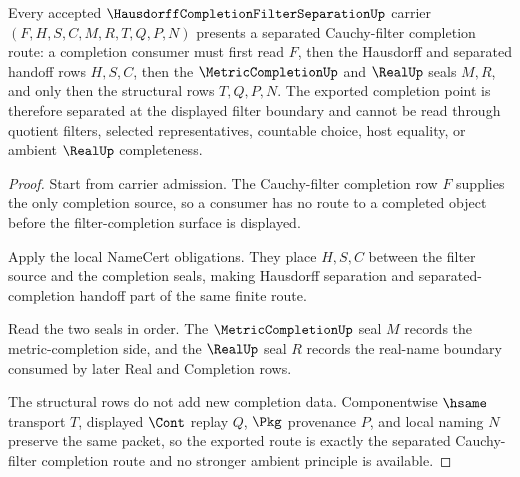 \begin{theorem}
\label{thm:hausdorff-completion-filter-separation}
Every accepted $\HausdorffCompletionFilterSeparationUp$ carrier $(F,H,S,C,M,R,T,Q,P,N)$ presents a separated Cauchy-filter completion route: a completion consumer must first read $F$, then the Hausdorff and separated handoff rows $H,S,C$, then the $\MetricCompletionUp$ and $\RealUp$ seals $M,R$, and only then the structural rows $T,Q,P,N$. The exported completion point is therefore separated at the displayed filter boundary and cannot be read through quotient filters, selected representatives, countable choice, host equality, or ambient $\RealUp$ completeness.
\end{theorem}
\begin{proof}
Start from carrier admission. The Cauchy-filter completion row $F$ supplies the only completion source, so a consumer has no route to a completed object before the filter-completion surface is displayed.

Apply the local NameCert obligations. They place $H,S,C$ between the filter source and the completion seals, making Hausdorff separation and separated-completion handoff part of the same finite route.

Read the two seals in order. The $\MetricCompletionUp$ seal $M$ records the metric-completion side, and the $\RealUp$ seal $R$ records the real-name boundary consumed by later Real and Completion rows.

The structural rows do not add new completion data. Componentwise $\hsame$ transport $T$, displayed $\Cont$ replay $Q$, $\Pkg$ provenance $P$, and local naming $N$ preserve the same packet, so the exported route is exactly the separated Cauchy-filter completion route and no stronger ambient principle is available.
\end{proof}


